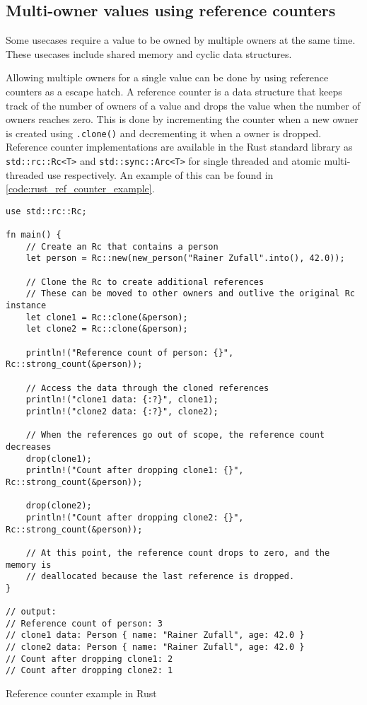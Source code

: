 \subsection{Multi-owner values using reference counters}

Some usecases require a value to be owned by multiple owners at the same time.
These usecases include shared memory and cyclic data structures.

Allowing multiple owners for a single value can be done by using reference counters as a escape hatch.
A reference counter is a data structure that keeps track of the number of owners
of a value and drops the value when the number of owners reaches zero.
This is done by incrementing the counter when a new owner is created using \texttt{.clone()}
and decrementing it when a owner is dropped.
Reference counter implementations are available in the Rust standard library
as \texttt{std::rc::Rc<T>} \cite[320-323]{rust_book_2019} and \texttt{std::sync::Arc<T>} \cite[361]{rust_book_2019} for single threaded and atomic
multi-threaded use respectively.
An example of this can be found in \autoref{code:rust_ref_counter_example}.

\begin{listing}
    \begin{verbatim}
use std::rc::Rc;

fn main() {
    // Create an Rc that contains a person
    let person = Rc::new(new_person("Rainer Zufall".into(), 42.0));

    // Clone the Rc to create additional references
    // These can be moved to other owners and outlive the original Rc instance
    let clone1 = Rc::clone(&person);
    let clone2 = Rc::clone(&person);

    println!("Reference count of person: {}", Rc::strong_count(&person));

    // Access the data through the cloned references
    println!("clone1 data: {:?}", clone1);
    println!("clone2 data: {:?}", clone2);

    // When the references go out of scope, the reference count decreases
    drop(clone1);
    println!("Count after dropping clone1: {}", Rc::strong_count(&person));

    drop(clone2);
    println!("Count after dropping clone2: {}", Rc::strong_count(&person));

    // At this point, the reference count drops to zero, and the memory is
    // deallocated because the last reference is dropped.
}

// output:
// Reference count of person: 3
// clone1 data: Person { name: "Rainer Zufall", age: 42.0 }
// clone2 data: Person { name: "Rainer Zufall", age: 42.0 }
// Count after dropping clone1: 2
// Count after dropping clone2: 1
    \end{verbatim}
    \caption{Reference counter example in Rust}
    \label{code:rust_ref_counter_example}
\end{listing}

